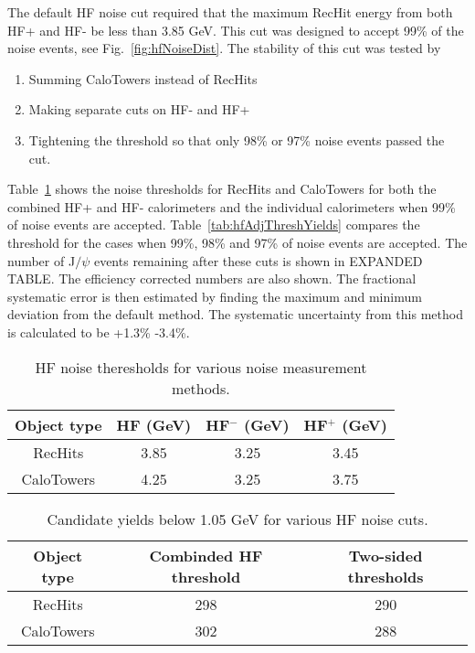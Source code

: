       The default HF noise cut required that the maximum RecHit energy
        from both HF+ and HF- be less than 3.85 GeV. 
      This cut was designed to accept 99\% of the noise events, 
        see Fig.~\ref{fig:hfNoiseDist}. 
      The stability of this cut was tested by
      \begin{enumerate}
        \item Summing CaloTowers instead of RecHits
        \item Making separate cuts on HF- and HF+
        \item Tightening the threshold so that only 98\% or 97\% noise events 
          passed the cut.
      \end{enumerate}

      Table~\ref{tab:hfNoiseThreshAsym} shows the noise thresholds for RecHits 
        and CaloTowers for both the combined HF+ and HF- calorimeters and the 
        individual calorimeters when 99\% of noise events are accepted.
      Table~\ref{tab:hfAdjThreshYields} compares the threshold for the cases 
        when 99\%, 98\% and 97\% of noise events are accepted.
      The number of J$/\psi$ events remaining after these cuts is shown in 
        EXPANDED TABLE. 
      The efficiency corrected numbers are also shown. 
      The fractional systematic error is then estimated by finding the maximum 
        and minimum deviation from the default method. 
      The systematic uncertainty from this method is calculated to be +1.3\% 
        -3.4\%.

      \begin{table}[!Hhbt]
        \centering
        \begin{tabular}{|c|c|c|c|}
          \hline
          Object type & HF (GeV) & HF$^{-}$ (GeV) & HF$^{+}$ (GeV) \\ \hline
          RecHits & 3.85 & 3.25 & 3.45 \\ \hline
          CaloTowers & 4.25 & 3.25 & 3.75 \\ \hline
        \end{tabular}
        \caption{HF noise theresholds for various noise measurement methods.}
        \label{tab:hfNoiseThreshAsym}
      \end{table}

      \begin{table}[!Hhbt]
        \centering
        \begin{tabular}{|c|c|c|}
          \hline
          Object type & Combinded HF threshold & Two-sided thresholds \\ \hline
          RecHits & 298 & 290 \\ \hline
          CaloTowers & 302 & 288 \\ \hline
        \end{tabular}
        \caption{Candidate yields below 1.05 GeV \pt{} for various HF noise
          cuts.}
        \label{tab:hfCutYieldEffects}
      \end{table}

